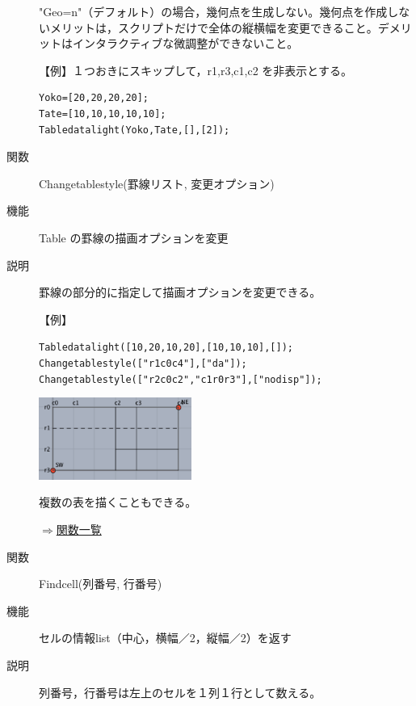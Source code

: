 \documentclass[papersize,a4paper,12pt,uplatex]{jsarticle}
\begin{document}
\begin{description}
\vspace{\baselineskip}
"Geo=n"（デフォルト）の場合，幾何点を生成しない。幾何点を作成しないメリットは，スクリプトだけで全体の縦横幅を変更できること。デメリットはインタラクティブな微調整ができないこと。

\vspace{\baselineskip}
【例】１つおきにスキップして，r1,r3,c1,c2 を非表示とする。
\begin{verbatim}
Yoko=[20,20,20,20];
Tate=[10,10,10,10,10];
Tabledatalight(Yoko,Tate,[],[2]);
\end{verbatim}

\vspace{\baselineskip}
\hypertarget{changetablestyle}{}
\item[関数]Changetablestyle(罫線リスト, 変更オプション)
\item[機能]Table の罫線の描画オプションを変更
\item[説明]罫線の部分的に指定して描画オプションを変更できる。

\vspace{\baselineskip}
【例】

\verb|Tabledatalight([10,20,10,20],[10,10,10],[]);|\\
\verb|Changetablestyle(["r1c0c4"],["da"]);|\\
\verb|Changetablestyle(["r2c0c2","c1r0r3"],["nodisp"]);|

\vspace{\baselineskip}
\hspace{20mm}\includegraphics[bb=0.00 0.00 324.00 174.00,width=50mm]{Fig/changetable.pdf} 

\vspace{\baselineskip}
複数の表を描くこともできる。

\begin{flushright}\hyperlink{functionlist}{$\Rightarrow$関数一覧}\end{flushright}

\vspace{\baselineskip}
\hypertarget{findcell}{}
\item[関数]Findcell(列番号, 行番号)
\item[機能]セルの情報list（中心，横幅／2，縦幅／2）を返す
\item[説明]列番号，行番号は左上のセルを１列１行として数える。


\end{description}
\end{document}
